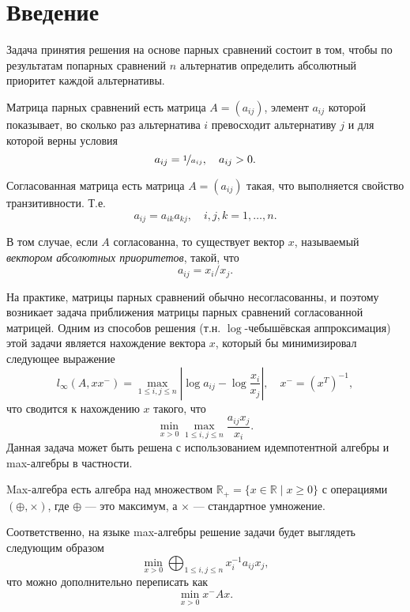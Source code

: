 \documentclass[specialist,
  substylefile = spbu.rtx,
  href,
  colorlinks=true,
  12pt]{disser}
\begin{document}
\maketitle
{}
\tableofcontents

\chapter*{Введение}
\label{sec:intro}
Задача принятия решения на основе парных сравнений состоит в том, чтобы по результатам попарных сравнений $n$ альтернатив определить абсолютный приоритет каждой альтернативы.

\begin{definition}{Матрица парных сравнений}
  есть матрица $A = (a_{ij})$, элемент $a_{ij}$ которой показывает, во сколько раз альтернатива $i$ превосходит альтернативу $j$ и для которой верны условия
  \[
    a_{ij} = \nicefrac{1}{a_{ij}}, \quad a_{ij} > 0.
  \]
\end{definition}
\begin{definition}{Согласованная матрица}
  есть матрица $A = (a_{ij})$ такая, что выполняется свойство транзитивности. Т.е.
  \[
    a_{ij} = a_{ik}a_{kj}, \quad i,j,k = 1,\dots,n.
  \]
\end{definition}
\begin{definition}
  В том случае, если $A$ согласованна, то существует вектор $x$, называемый \textit{вектором абсолютных приоритетов}, такой, что
  \[
    a_{ij} = x_{i}/x_{j}.
  \]
\end{definition}
   На практике, матрицы парных сравнений обычно несогласованны, и поэтому возникает задача приближения матрицы парных сравнений согласованной матрицей.
  Одним из способов решения (т.н. $\log$-чебышёвская аппроксимация) этой задачи является нахождение вектора $x$, который бы минимизировал следующее выражение
  \[
  l_{\infty}\left(A, x x^{-}\right)=\max _{1 \leq i, j \leq n}\left|\log a_{i j}-\log \frac{x_{i}}{x_{j}}\right|, \quad x^{-} = (x^{T})^{-1},
  \]
  что сводится к нахождению $x$ такого, что
  \[
    \min _{x>0} \max _{1 \leq i, j \leq n} \frac{a_{i j} x_{j}}{x_{i}}.
  \]
  Данная задача может быть решена с использованием идемпотентной алгебры и max-алгебры в частности.
\begin{definition}{Max-алгебра}
  есть алгебра над множеством $\mathbb{R}_{+}=\{x \in \mathbb{R} \mid x \geq 0\}$ с операциями ${(\oplus, \times)}$, где $\oplus$ --- это максимум, а $\times$ --- стандартное умножение.
\end{definition}
Соответственно, на языке max-алгебры решение задачи будет выглядеть следующим образом
\[
  \min _{x>0} \bigoplus_{1 \leq i, j \leq n} x_{i}^{-1} a_{i j} x_{j},
\]
что можно дополнительно переписать как
\[
  \min _{x>0} x^{-} A x.
\]
\end{document}
